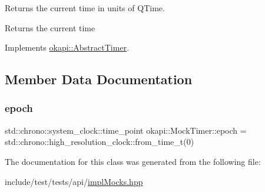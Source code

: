 Returns the current time in units of Q\+Time. 

\begin{DoxyReturn}{Returns}
the current time 
\end{DoxyReturn}


Implements \mbox{\hyperlink{classokapi_1_1AbstractTimer_a6871e119f74d8b6a8c928244e837e762}{okapi\+::\+Abstract\+Timer}}.



\subsection{Member Data Documentation}
\mbox{\label{classokapi_1_1MockTimer_a43cd4e080867a28c269ba1268e309e09}} 
\subsubsection{\texorpdfstring{epoch}{epoch}}
{\footnotesize\ttfamily std\+::chrono\+::system\+\_\+clock\+::time\+\_\+point okapi\+::\+Mock\+Timer\+::epoch = std\+::chrono\+::high\+\_\+resolution\+\_\+clock\+::from\+\_\+time\+\_\+t(0)}



The documentation for this class was generated from the following file\+:\begin{DoxyCompactItemize}
\item 
include/test/tests/api/\mbox{\hyperlink{implMocks_8hpp}{impl\+Mocks.\+hpp}}\end{DoxyCompactItemize}
